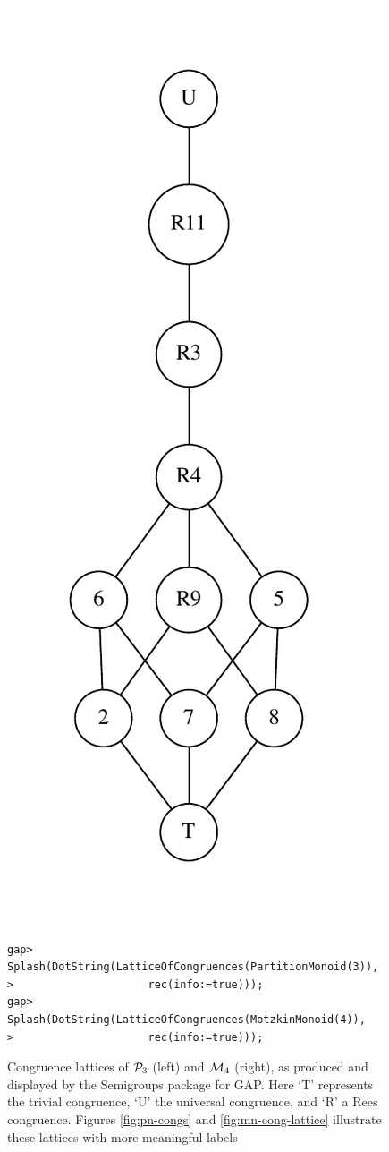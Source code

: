 \begin{figure}[p]
  \includegraphics[scale=0.6]{pics/ch-motzkin/m4-lattice.pdf}
\begin{verbatim}
gap> Splash(DotString(LatticeOfCongruences(PartitionMonoid(3)),
>                     rec(info:=true)));
gap> Splash(DotString(LatticeOfCongruences(MotzkinMonoid(4)),
>                     rec(info:=true)));
\end{verbatim}
  \caption[Congruence lattices of $\Prt_3$ and $\Mot_4$ displayed using GAP]
  {Congruence lattices of $\Prt_3$ (left) and $\Mot_4$ (right), as produced and
    displayed by the Semigroups package for GAP.  Here `T' represents the
    trivial congruence, `U' the universal congruence, and `R' a Rees congruence.
    Figures \ref{fig:pn-congs} and \ref{fig:mn-cong-lattice} illustrate these
    lattices with more meaningful labels}
    \label{fig:gap-lattices}
\end{figure}

